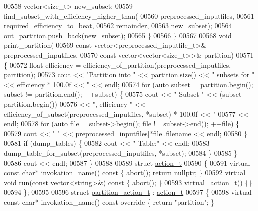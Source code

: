 \begin{DoxyCode}
{{00558     vector<size\_t> new\_subset;
00559     find\_subset\_with\_efficiency\_higher\_than(
00560       preprocessed\_inputfiles,
00561       required\_efficiency\_to\_beat,
00562       remainder,
00563       new\_subset);
00564     out\_partition.push\_back(new\_subset);
00565   \}
00566 \}
00567 
00568 \textcolor{keywordtype}{void} print\_partition(
00569        \textcolor{keyword}{const} vector<preprocessed\_inputfile\_t>& preprocessed\_inputfiles,
00570        \textcolor{keyword}{const} vector<vector<size\_t>>& partition)
00571 \{
00572   \textcolor{keywordtype}{float} efficiency = efficiency\_of\_partition(preprocessed\_inputfiles, partition);
00573   cout << \textcolor{stringliteral}{"Partition into "} << partition.size() << \textcolor{stringliteral}{" subsets for "} << efficiency * 100.0f << \textcolor{stringliteral}{"%
        << endl;
00574   \textcolor{keywordflow}{for} (\textcolor{keyword}{auto} subset = partition.begin(); subset != partition.end(); ++subset) \{
00575     cout << \textcolor{stringliteral}{"  Subset "} << (subset - partition.begin())
00576          << \textcolor{stringliteral}{", efficiency "} << efficiency\_of\_subset(preprocessed\_inputfiles, *subset) * 100.0f << \textcolor{stringliteral}{"%
00577          << endl;
00578     \textcolor{keywordflow}{for} (\textcolor{keyword}{auto} \hyperlink{structfile}{file} = subset->begin(); \hyperlink{structfile}{file} != subset->end(); ++\hyperlink{structfile}{file}) \{
00579       cout << \textcolor{stringliteral}{"    "} << preprocessed\_inputfiles[*\hyperlink{structfile}{file}].filename << endl;
00580     \}
00581     \textcolor{keywordflow}{if} (dump\_tables) \{
00582       cout << \textcolor{stringliteral}{"  Table:"} << endl;
00583       dump\_table\_for\_subset(preprocessed\_inputfiles, *subset);
00584     \}
00585   \}
00586   cout << endl;
00587 \}
00588 
00589 \textcolor{keyword}{struct }\hyperlink{structaction__t}{action\_t}
00590 \{
00591   \textcolor{keyword}{virtual} \textcolor{keyword}{const} \textcolor{keywordtype}{char}* invokation\_name()\textcolor{keyword}{ const }\{ abort(); \textcolor{keywordflow}{return} \textcolor{keyword}{nullptr}; \}
00592   \textcolor{keyword}{virtual} \textcolor{keywordtype}{void} run(\textcolor{keyword}{const} vector<string>&)\textcolor{keyword}{ const }\{ abort(); \}
00593   \textcolor{keyword}{virtual} ~\hyperlink{structaction__t}{action\_t}() \{\}
00594 \};
00595 
00596 \textcolor{keyword}{struct }\hyperlink{structpartition__action__t}{partition\_action\_t} : \hyperlink{structaction__t}{action\_t}
00597 \{
00598   \textcolor{keyword}{virtual} \textcolor{keyword}{const} \textcolor{keywordtype}{char}* invokation\_name()\textcolor{keyword}{ const override }\{ \textcolor{keywordflow}{return} \textcolor{stringliteral}{"partition"}; \}
}}}}
\end{DoxyCode}

